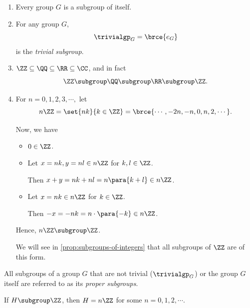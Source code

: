 \begin{examples}
    \begin{enumerate}
        \item Every group \(G\) is a subgroup of itself.

        \item For any group \(G\),
        \[
            \trivialgp_G = \brce{e_G}
        \]
        is the \emph{trivial subgroup}.

        \item \(\ZZ \subseteq \QQ \subseteq \RR \subseteq \CC\), and in fact
        \[
            \ZZ \subgroup \QQ \subgroup \RR \subgroup \ZZ.
        \]

        \item For \(n = 0, 1, 2, 3, \cdots,\) let
        \[
            n\ZZ = \set{nk}{k \in \ZZ} = \brce{\cdots, -2n, -n, 0, n, 2, \cdots}.
        \]

        Now, we have
        \begin{itemize}
            \item \(0 \in \ZZ\).
            \item Let \(x = nk, y = nl \in n\ZZ\) for \(k, l \in \ZZ\).
            
            Then \(x + y = nk + nl = n \para{k + l} \in n\ZZ\).
            \item Let \(x = nk \in n\ZZ\) for \(k \in \ZZ\).
            
            Then \(-x = -nk = n \cdot \para{-k} \in n\ZZ\).
        \end{itemize}

        Hence, \(n\ZZ \subgroup \ZZ\).

        We will see in \autoref{prop:subgroups-of-integers} that all subgroups of \(\ZZ\) are of this form.
    \end{enumerate}
\end{examples}

\begin{remark}
    All subgroups of a group \(G\) that are not trivial (\(\trivialgp_G\)) or the group \(G\) itself are referred to as its \emph{proper subgroups}.
\end{remark}

\begin{proposition}
    \label{prop:subgroups-of-integers}%
    If \(H \subgroup \ZZ\), then \(H = n\ZZ\) for some \(n = 0, 1, 2, \cdots\).
\end{proposition}

